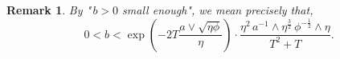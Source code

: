 \documentclass[10pt]{article}
\newtheorem{remark}[theorem]{Remark}
\begin{document}
\begin{remark}\label{rmk on b}
    By "$\,b>0$ small enough", we mean precisely that,
    \begin{equation}\label{bound of b}
        0 < b < \exp\left( - 2T\frac{a \vee \sqrt{\eta\phi}}{\eta}\right) \cdot \frac{\eta^2\,a^{-1} \wedge \eta^{\frac 32}\,\phi^{-\frac 12} \wedge \eta}{T^2+T}.
    \end{equation}
\end{remark}
\end{document}
